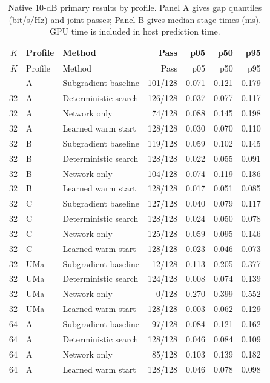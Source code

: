 \documentclass[10pt,letterpaper]{article}
\begin{document}
\begingroup\small\setlength{\tabcolsep}{4pt}
\begin{longtable}{rllrrrr}\caption{Native 10-dB primary results by profile. Panel A gives gap quantiles (bit/s/Hz) and joint passes; Panel B gives median stage times (ms). GPU time is included in host prediction time.}\label{supp:table3}\\
\toprule $K$ & Profile & Method & Pass & p05 & p50 & p95\\\midrule\endfirsthead\toprule $K$ & Profile & Method & Pass & p05 & p50 & p95\\\midrule\endhead\bottomrule\endfoot
32 & A & Subgradient baseline & 101/128 & 0.071 & 0.121 & 0.179\\
32 & A & Deterministic search & 126/128 & 0.037 & 0.077 & 0.117\\
32 & A & Network only & 74/128 & 0.088 & 0.145 & 0.198\\
32 & A & Learned warm start & 128/128 & 0.030 & 0.070 & 0.110\\
32 & B & Subgradient baseline & 119/128 & 0.059 & 0.102 & 0.145\\
32 & B & Deterministic search & 128/128 & 0.022 & 0.055 & 0.091\\
32 & B & Network only & 104/128 & 0.074 & 0.119 & 0.186\\
32 & B & Learned warm start & 128/128 & 0.017 & 0.051 & 0.085\\
32 & C & Subgradient baseline & 127/128 & 0.040 & 0.079 & 0.117\\
32 & C & Deterministic search & 128/128 & 0.024 & 0.050 & 0.078\\
32 & C & Network only & 125/128 & 0.059 & 0.095 & 0.146\\
32 & C & Learned warm start & 128/128 & 0.023 & 0.046 & 0.073\\
32 & UMa & Subgradient baseline & 12/128 & 0.113 & 0.205 & 0.377\\
32 & UMa & Deterministic search & 124/128 & 0.008 & 0.074 & 0.139\\
32 & UMa & Network only & 0/128 & 0.270 & 0.399 & 0.552\\
32 & UMa & Learned warm start & 128/128 & 0.003 & 0.062 & 0.129\\
64 & A & Subgradient baseline & 97/128 & 0.084 & 0.121 & 0.162\\
64 & A & Deterministic search & 128/128 & 0.046 & 0.084 & 0.109\\
64 & A & Network only & 85/128 & 0.103 & 0.139 & 0.182\\
64 & A & Learned warm start & 128/128 & 0.046 & 0.078 & 0.098\\

\end{longtable}
\end{document}
